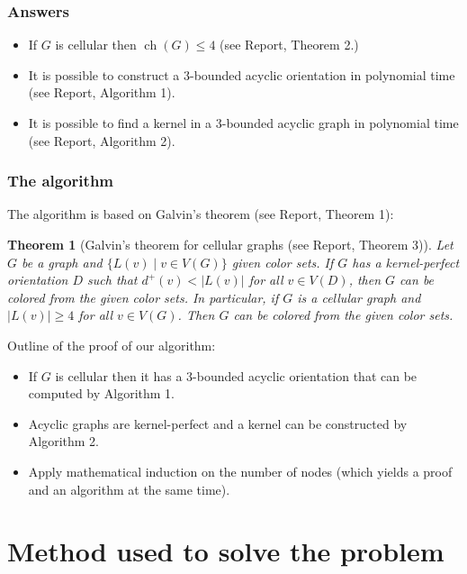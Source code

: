 \documentclass{beamer}
\newtheorem{theo}[lem]{Theorem}
\DeclareMathOperator*{\ch}{ch}
\begin{document}
\begin{frame}
\frametitle{Answers}
\justifying
\begin{itemize}
\item If $G$ is cellular then $\ch(G) \leqslant 4$ (see Report,  Theorem 2.)
\pause \item It is possible to construct a $3$-bounded acyclic orientation in polynomial time (see Report, Algorithm 1).
\pause \item It is possible to find a kernel in a $3$-bounded acyclic graph in polynomial time (see Report, Algorithm 2).
\end{itemize}
\end{frame}


\begin{frame}
\frametitle{The algorithm}
\justifying
The algorithm is based on Galvin's theorem (see Report, Theorem 1):
\begin{theo}[Galvin's theorem for cellular graphs (see Report, Theorem 3)] Let $G$ be a graph and $\lbrace L(v) \mid v \in V(G) \rbrace$ given color sets. If $G$ has a kernel-perfect orientation $D$ such that $d^+(v) < |L(v)|$ for all $v \in V(D)$, then $G$ can be colored from the given color sets.
In particular, if $G$ is a cellular graph and $|L(v)| \geqslant 4$ for all $v \in V(G)$. Then $G$ can be colored from the given color sets.
\end{theo}
\pause Outline of the proof of our algorithm:
\begin{itemize}
\item If $G$ is cellular then it has a $3$-bounded acyclic orientation that can be computed by Algorithm 1.
\pause \item Acyclic graphs are kernel-perfect and a kernel can be constructed by Algorithm 2.
\pause \item Apply mathematical induction on the number of nodes (which yields a proof and an algorithm at the same time).
\end{itemize}
\end{frame}

\section{Method used to solve the problem}
\end{document}
